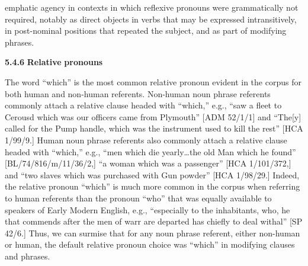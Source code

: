 emphatic agency in contexts in which reflexive pronouns were grammatically not required, notably as direct objects in verbs that may be expressed intransitively, in post-nominal positions that repeated the subject, and as part of modifying phrases. 

  \textbf{5.4.6} \textbf{Relative} \textbf{pronouns}

  The word “which” is the most common relative pronoun evident in the corpus for both human and non-human referents. Non-human noun phrase referents commonly attach a relative clause headed with “which,” e.g., “saw a fleet to Cerousd which was our officers came from Plymouth” [ADM 52/1/1] and “The[y] called for the Pump handle, which was the instrument used to kill the rest” [HCA 1/99/9.] Human noun phrase referents also commonly attach a relative clause headed with “which,” e.g., “men which die yearly…the old Man which he found” [BL/74/816/m/11/36/2,] “a woman which was a passenger” [HCA 1/101/372,] and “two slaves which was purchased with Gun powder” [HCA 1/98/29.] Indeed, the relative pronoun “which” is much more common in the corpus when referring to human referents than the pronoun “who” that was equally available to speakers of Early Modern English, e.g., “especially to the inhabitants, who, he that commends after the men of warr are departed has chiefly to deal withal” [SP 42/6.] Thus, we can surmise that for any noun phrase referent, either non-human or human, the default relative pronoun choice was “which” in modifying clauses and phrases. 


